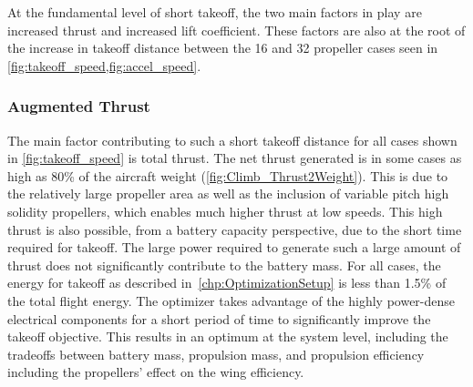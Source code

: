 \documentclass[conf]{new-aiaa}
\begin{document}
At the fundamental level of short takeoff, the two main factors in play are increased thrust and increased lift coefficient. These factors are also at the root of the increase in takeoff distance between the 16 and 32 propeller cases seen in \cref{fig:takeoff_speed,fig:accel_speed}.


\subsubsection{Augmented Thrust}


The main factor contributing to such a short takeoff distance for all cases shown in \cref{fig:takeoff_speed} is total thrust. The net thrust generated is in some cases as high as 80\% of the aircraft weight (\cref{fig:Climb_Thrust2Weight}). This is due to the relatively large propeller area as well as the inclusion of variable pitch high solidity propellers, which enables much higher thrust at low speeds. This high thrust is also possible, from a battery capacity perspective, due to the short time required for takeoff. The large power required to generate such a large amount of thrust does not significantly contribute to the battery mass. For all cases, the energy for takeoff as described in~\cref{chp:OptimizationSetup} is less than 1.5\% of the total flight energy. The optimizer takes advantage of the highly power-dense electrical components for a short period of time to significantly improve the takeoff objective. This results in an optimum at the system level, including the tradeoffs between battery mass, propulsion mass, and propulsion efficiency including the propellers' effect on the wing efficiency.
\end{document}
